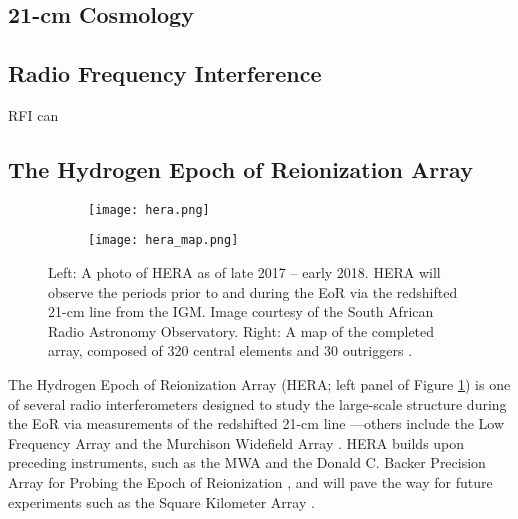 \documentclass[12pt]{article}
\begin{document}
\subsection{21-cm Cosmology} \label{subsec:ps}

\red{[What is it?]}


\subsection{Radio Frequency Interference} \label{subsec:rfi}

RFI can 

\subsection{The Hydrogen Epoch of Reionization Array} \label{subsec:hera}

\begin{figure}[tb]
	\centering
	\begin{subfigure}{0.48\textwidth}
		\centering
		{\texttt{[image: hera.png]}}
	\end{subfigure} \hfill
	\begin{subfigure}{0.48\textwidth}
		\centering
		{\texttt{[image: hera\_map.png]}}
	\end{subfigure}
	\caption[The Hydrogen Epoch of Reionization Array]{Left: A photo of HERA as of late 2017 -- early 2018. HERA will observe the periods prior to and during the EoR via the redshifted 21-cm line from the IGM. Image courtesy of the South African Radio Astronomy Observatory. Right: A map of the completed array, composed of 320 central elements and 30 outriggers \citep{deboer2017}.}
	\label{fig:hera}
\end{figure}

The Hydrogen Epoch of Reionization Array (HERA; left panel of Figure \ref{fig:hera}) is one of several radio interferometers designed to study the large-scale structure during the EoR via measurements of the redshifted 21-cm line \citep{deboer2017}---others include the Low Frequency Array \citep[LOFAR;][]{vanHaarlem2013} and the Murchison Widefield Array \citep[MWA;][]{tingay2013}. HERA builds upon preceding instruments, such as the MWA and the Donald C. Backer Precision Array for Probing the Epoch of Reionization \citep[PAPER;][]{parsons2010}, and will pave the way for future experiments such as the Square Kilometer Array \cite[SKA; e.g.,][]{mellema2013}.
\end{document}
